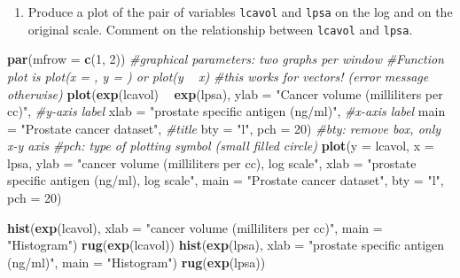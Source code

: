 \documentclass[]{book}
\newenvironment{Shaded}{\begin{snugshade}}{\end{snugshade}}
\newcommand{\KeywordTok}[1]{\textcolor[rgb]{0.13,0.29,0.53}{\textbf{#1}}}
\newcommand{\DataTypeTok}[1]{\textcolor[rgb]{0.13,0.29,0.53}{#1}}
\newcommand{\DecValTok}[1]{\textcolor[rgb]{0.00,0.00,0.81}{#1}}
\newcommand{\StringTok}[1]{\textcolor[rgb]{0.31,0.60,0.02}{#1}}
\newcommand{\CommentTok}[1]{\textcolor[rgb]{0.56,0.35,0.01}{\textit{#1}}}
\newcommand{\OperatorTok}[1]{\textcolor[rgb]{0.81,0.36,0.00}{\textbf{#1}}}
\newcommand{\NormalTok}[1]{#1}
\providecommand{\tightlist}{%
  \setlength{\itemsep}{0pt}\setlength{\parskip}{0pt}}
\theoremstyle{definition}
\theoremstyle{definition}
\theoremstyle{definition}
\theoremstyle{remark}
\begin{document}
\begin{enumerate}
\def\labelenumi{\alph{enumi}.}
\setcounter{enumi}{1}
\tightlist
\item
  Produce a plot of the pair of variables \texttt{lcavol} and
  \texttt{lpsa} on the log and on the original scale. Comment on the
  relationship between \texttt{lcavol} and \texttt{lpsa}.
\end{enumerate}

\begin{Shaded}
\begin{Highlighting}[]
\KeywordTok{par}\NormalTok{(}\DataTypeTok{mfrow =} \KeywordTok{c}\NormalTok{(}\DecValTok{1}\NormalTok{, }\DecValTok{2}\NormalTok{)) }\CommentTok{#graphical parameters: two graphs per window}
\CommentTok{#Function plot is plot(x = , y = ) or plot(y ~ x)}
\CommentTok{#this works for vectors! (error message otherwise)}
\KeywordTok{plot}\NormalTok{(}\KeywordTok{exp}\NormalTok{(lcavol) }\OperatorTok{~}\StringTok{ }\KeywordTok{exp}\NormalTok{(lpsa),}
\DataTypeTok{ylab =} \StringTok{"Cancer volume (milliliters per cc)"}\NormalTok{, }\CommentTok{#y-axis label}
\DataTypeTok{xlab =} \StringTok{"prostate specific antigen (ng/ml)"}\NormalTok{, }\CommentTok{#x-axis label}
\DataTypeTok{main =} \StringTok{"Prostate cancer dataset"}\NormalTok{, }\CommentTok{#title}
\DataTypeTok{bty =} \StringTok{"l"}\NormalTok{, }\DataTypeTok{pch =} \DecValTok{20}\NormalTok{) }\CommentTok{#bty: remove box, only x-y axis}
\CommentTok{#pch: type of plotting symbol (small filled circle)}
\KeywordTok{plot}\NormalTok{(}\DataTypeTok{y =}\NormalTok{ lcavol, }\DataTypeTok{x =}\NormalTok{ lpsa,}
\DataTypeTok{ylab =} \StringTok{"cancer volume (milliliters per cc), log scale"}\NormalTok{,}
\DataTypeTok{xlab =} \StringTok{"prostate specific antigen (ng/ml), log scale"}\NormalTok{, }
\DataTypeTok{main =} \StringTok{"Prostate cancer dataset"}\NormalTok{,}
\DataTypeTok{bty =} \StringTok{"l"}\NormalTok{, }\DataTypeTok{pch =} \DecValTok{20}\NormalTok{)}

\KeywordTok{hist}\NormalTok{(}\KeywordTok{exp}\NormalTok{(lcavol), }\DataTypeTok{xlab =} \StringTok{"cancer volume (milliliters per cc)"}\NormalTok{, }\DataTypeTok{main =} \StringTok{"Histogram"}\NormalTok{)}
\KeywordTok{rug}\NormalTok{(}\KeywordTok{exp}\NormalTok{(lcavol))}
\KeywordTok{hist}\NormalTok{(}\KeywordTok{exp}\NormalTok{(lpsa), }\DataTypeTok{xlab =} \StringTok{"prostate specific antigen (ng/ml)"}\NormalTok{, }\DataTypeTok{main =} \StringTok{"Histogram"}\NormalTok{)}
\KeywordTok{rug}\NormalTok{(}\KeywordTok{exp}\NormalTok{(lpsa))}
\end{Highlighting}
\end{Shaded}
\end{document}
